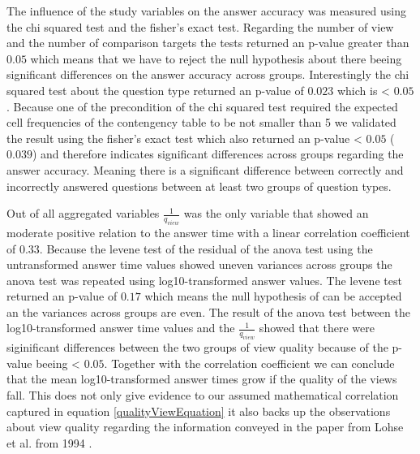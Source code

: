 The influence of the study variables on the answer accuracy was measured using the chi squared test and the fisher's exact test. Regarding the
number of view and the number of comparison targets the tests returned an p-value greater than $0.05$ which means
that we have to reject the null hypothesis about there beeing significant differences on the answer accuracy across groups. Interestingly the
chi squared test about the question type returned an p-value of $0.023$ which is < $0.05$. Because one of the precondition of the chi squared test
required the expected cell frequencies of the contengency table to be not smaller than 5 we validated the result using the fisher's exact test which also
returned an p-value < $0.05$ ($0.039$) and therefore indicates significant differences across groups regarding the answer accuracy. Meaning there is a significant
difference between correctly and incorrectly answered questions between at least two groups of question types.

Out of all aggregated variables $\frac{1}{q_{view}}$ was the only variable that showed an moderate positive relation to the answer time with a linear correlation coefficient of $0.33$.
Because the levene test of the residual of the anova test using the untransformed answer time values showed uneven variances across groups the anova test was repeated
using log10-transformed answer values. The levene test returned an p-value of $0.17$ which means the null hypothesis of can be accepted an the variances across groups are even.
The result of the anova test between the log10-transformed answer time values and the $\frac{1}{q_{view}}$ showed that there were siginificant differences between
the two groups of view quality because of the p-value beeing < $0.05$. Together with the correlation coefficient we can conclude that the mean log10-transformed answer times
grow if the quality of the views fall. This does not only give evidence to our assumed mathematical correlation captured in equation \ref{qualityViewEquation} it also backs up
the observations about view quality regarding the information conveyed in the paper from Lohse et al. from 1994 \citep{Lohse.1994}.


